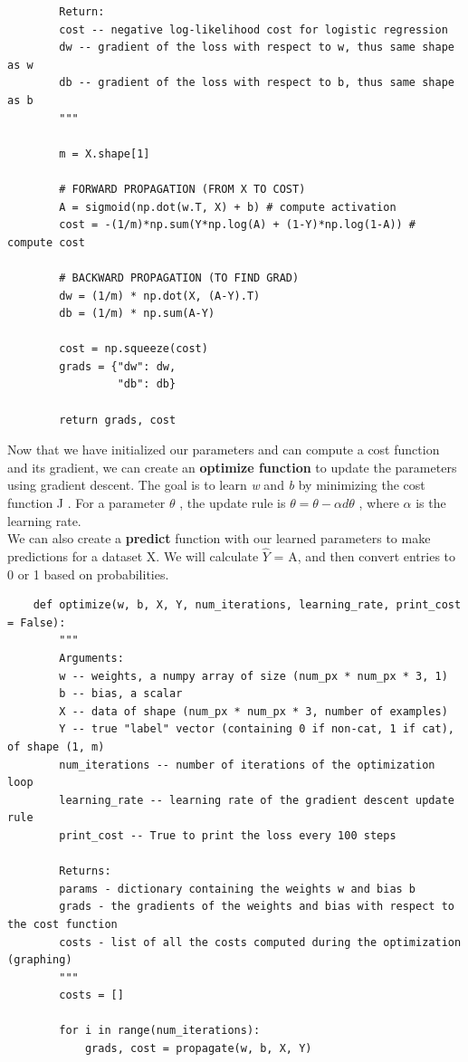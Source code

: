 \documentclass[11pt, a4paper]{article}
\begin{document}
\begin{spacing}{1.1}
\begin{lstlisting}
		Return:
		cost -- negative log-likelihood cost for logistic regression
		dw -- gradient of the loss with respect to w, thus same shape as w
		db -- gradient of the loss with respect to b, thus same shape as b
		"""
		
		m = X.shape[1]
		
		# FORWARD PROPAGATION (FROM X TO COST)
		A = sigmoid(np.dot(w.T, X) + b) # compute activation
		cost = -(1/m)*np.sum(Y*np.log(A) + (1-Y)*np.log(1-A)) # compute cost
		
		# BACKWARD PROPAGATION (TO FIND GRAD)
		dw = (1/m) * np.dot(X, (A-Y).T)
		db = (1/m) * np.sum(A-Y)
		
		cost = np.squeeze(cost)
		grads = {"dw": dw,
		         "db": db}
		
		return grads, cost \end{lstlisting} \vspace*{1mm} 
	Now that we have initialized our parameters and can compute a cost function and its gradient, we can create an  \textbf{optimize function} to update the parameters using gradient descent. The goal is to learn \textit{w}  and \textit{b} by minimizing the cost function J . For a parameter $\theta$ , the update rule is $\theta = \theta - \alpha d\theta$ , where $\alpha$  is the learning rate. \vspace*{1mm} \\
	We can also create a \textbf{predict} function with our learned parameters to make predictions for a dataset X. We will calculate $\hat{Y}$ = A, and then convert entries to 0 or 1 based on probabilities. \newpage

	\begin{lstlisting}
	def optimize(w, b, X, Y, num_iterations, learning_rate, print_cost = False):
		"""
		Arguments:
		w -- weights, a numpy array of size (num_px * num_px * 3, 1)
		b -- bias, a scalar
		X -- data of shape (num_px * num_px * 3, number of examples)
		Y -- true "label" vector (containing 0 if non-cat, 1 if cat), of shape (1, m)
		num_iterations -- number of iterations of the optimization loop
		learning_rate -- learning rate of the gradient descent update rule
		print_cost -- True to print the loss every 100 steps
		
		Returns:
		params - dictionary containing the weights w and bias b
		grads - the gradients of the weights and bias with respect to the cost function
		costs - list of all the costs computed during the optimization (graphing)
		"""
		costs = []
		
		for i in range(num_iterations):
			grads, cost = propagate(w, b, X, Y)
			

\end{lstlisting}
\end{spacing}
\end{document}
